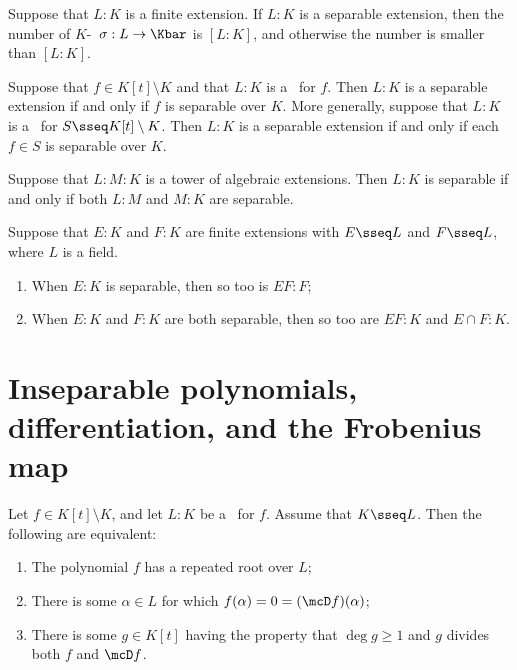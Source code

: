 \documentclass{article}
\begin{document}
  \begin{tcorollary}
    Suppose that $L:K$ is a finite extension. If $L:K$ is a separable extension, then the number of $K$-\homo~$\sigma:L\to\Kbar$ is $[L:K]$, and otherwise the number is smaller than $[L:K]$.
  \end{tcorollary}

  \begin{tcorollary}
    Suppose that $f\in K[t]\setminus K$ and that $L:K$ is a \sfe~for $f$. Then $L:K$ is a separable extension if and only if $f$ is separable over $K$. More generally, suppose that $L:K$ is a \sfe~for $S\sseq K[t]\setminus K$. Then $L:K$ is a separable extension if and only if each $f\in S$ is separable over $K$.
  \end{tcorollary}

  \begin{ttheorem}
    Suppose that $L:M:K$ is a tower of algebraic extensions. Then $L:K$ is separable if and only if both $L:M$ and $M:K$ are separable.
  \end{ttheorem}

  \begin{ttheorem}
    Suppose that $E:K$ and $F:K$ are finite extensions with $E\sseq L$ and $F\sseq L$, where $L$ is a field.
    \begin{enumerate}[label=(\alph*)]
      \item When $E:K$ is separable, then so too is $EF:F$;
      \item When $E:K$ and $F:K$ are both separable, then so too are $EF:K$ and $E\cap F:K$.
    \end{enumerate}
  \end{ttheorem}

\section{Inseparable polynomials, differentiation, and the Frobenius map}
  \begin{ttheorem}
    Let $f\in K[t]\setminus K$, and let $L:K$ be a \sfe~for $f$. Assume that $K\sseq L$. Then the following are equivalent:
    \begin{enumerate}[label=(\roman*)]
      \item The polynomial $f$ has a repeated root over $L$;
      \item There is some $\alpha\in L$ for which $f(\alpha)=0=(\mcD f)(\alpha)$;
      \item There is some $g\in K[t]$ having the property that $\deg g\geq 1$ and $g$ divides both $f$ and $\mcD f$.
    \end{enumerate}
  \end{ttheorem}
\end{document}
